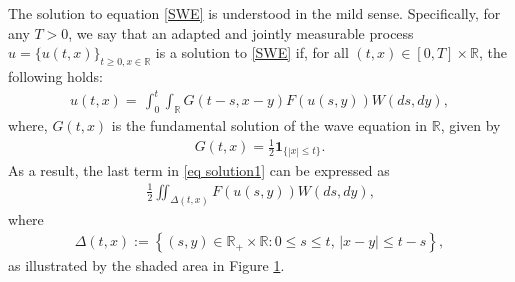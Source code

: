 \documentclass[11pt,reqno]{amsart}
\numberwithin{equation}{section}
\newcommand{\1}{{\bf 1}}
\newcommand{\2}{{\bf 2}}
\begin{document}
 
  
   The solution to equation \eqref{SWE}  is understood in the mild sense. Specifically, for any $T>0$, we say that an adapted and 
 jointly measurable   process $u=\{u(t,x)\}_{t\ge0, x\in \mathbb R}$  is a solution to   \eqref{SWE} if, for all $(t,x)\in [0,T]\times \mathbb R$, the following holds:
\begin{equation}\label{eq solution1}
\begin{split}
u(t,x) =  \, \int_0^t\int_{\mathbb R} G(t-s, x-y) F(u(s,y))W(ds,dy),
   \end{split}
\end{equation}
where,  $G(t, x)$ is the   fundamental solution of the    wave equation in $\mathbb R$, given by 
\begin{align}\label{eq fund}
G(t,x)=\frac{1}{2}\mathbf 1_{\{|x|\le t\}}.
\end{align} 
As a result,   the last term in \eqref{eq solution1}  can be expressed as 
 \begin{equation}\label{eq solution}
\begin{split}
   \, \frac{1}{2}\iint_{\Delta(t,x)} F(u(s,y))W(ds,dy),
   \end{split}
\end{equation}
 where  
  \begin{align}
\Delta(t, x):=\left\{(s,y)\in \mathbb R_+\times \mathbb R: 0\le s\le t, \, |x-y|\le t-s \right\},
\end{align}
as illustrated  by the shaded area in Figure \ref{fig1}.
 
\begin{figure}
\caption{}\label{fig1}
\end{figure}
\end{document}
